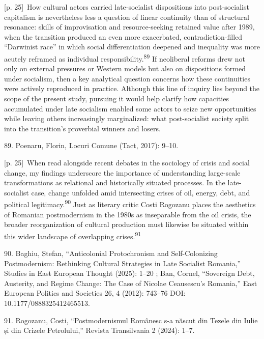 \documentclass[10pt,a4paper]{article}
\begin{document}
{\scriptsize\color{gray} [p. 25]}\ How cultural actors carried late-socialist dispositions into post-socialist capitalism is nevertheless less a question of linear continuity than of structural resonance: skills of improvisation and resource-seeking retained value after 1989, when the transition produced an even more exacerbated, contradiction-filled “Darwinist race” in which social differentiation deepened and inequality was more acutely reframed as individual responsibility.\nobreak\textsuperscript{89} If neoliberal reforms drew not only on external pressures or Western models but also on dispositions formed under socialism, then a key analytical question concerns how these continuities were actively reproduced in practice. Although this line of inquiry lies beyond the scope of the present study, pursuing it would help clarify how capacities accumulated under late socialism enabled some actors to seize new opportunities while leaving others increasingly marginalized: what post-socialist society split into the transition’s proverbial winners and losers.\par{\small 89. Poenaru, Florin, Locuri Comune (Tact, 2017): 9–10.\par}
{\scriptsize\color{gray} [p. 25]}\ When read alongside recent debates in the sociology of crisis and social change, my findings underscore the importance of understanding large-scale transformations as relational and historically situated processes. In the late-socialist case, change unfolded amid intersecting crises of oil, energy, debt, and political legitimacy.\nobreak\textsuperscript{90} Just as literary critic Costi Rogozanu places the aesthetics of Romanian postmodernism in the 1980s as inseparable from the oil crisis, the broader reorganization of cultural production must likewise be situated within this wider landscape of overlapping crises.\nobreak\textsuperscript{91}\par{\small 90. Baghiu, Ștefan, “Anticolonial Protochronism and Self-Colonizing Postmodernism: Rethinking Cultural Strategies in Late Socialist Romania,” Studies in East European Thought (2025): 1–20 ; Ban, Cornel, “Sovereign Debt, Austerity, and Regime Change: The Case of Nicolae Ceausescu’s Romania,” East European Politics and Societies 26, 4 (2012): 743–76 DOI: 10.1177/0888325412465513.\par}{\small 91. Rogozanu, Costi, “Postmodernismul Românesc s-a născut din Tezele din Iulie și din Crizele Petrolului,” Revista Transilvania 2 (2024): 1–7.\par}
\end{document}
